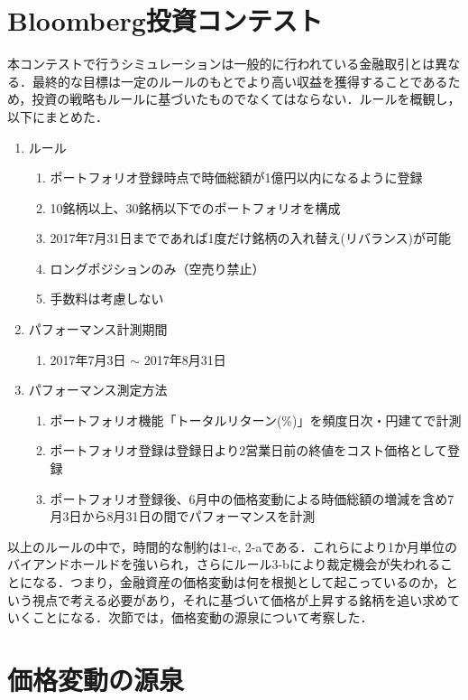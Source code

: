 \documentclass[11pt]{jreport}
\begin{document}
\section{Bloomberg投資コンテスト}
本コンテストで行うシミュレーションは一般的に行われている金融取引とは異なる．最終的な目標は一定のルールのもとでより高い収益を獲得することであるため，投資の戦略もルールに基づいたものでなくてはならない．ルールを概観し，以下にまとめた．

\begin{enumerate}
\item ルール
\begin{enumerate}
\item ポートフォリオ登録時点で時価総額が1億円以内になるように登録
\item 10銘柄以上、30銘柄以下でのポートフォリオを構成
\item 2017年7月31日までであれば1度だけ銘柄の入れ替え(リバランス)が可能
\item ロングポジションのみ（空売り禁止）
\item 手数料は考慮しない
\end{enumerate}

\item パフォーマンス計測期間
\begin{enumerate}
\item  2017年7月3日 $\sim$ 2017年8月31日
\end{enumerate}

\item パフォーマンス測定方法
\begin{enumerate}
\item ポートフォリオ機能「トータルリターン(\%)」を頻度日次・円建てで計測
\item ポートフォリオ登録は登録日より2営業日前の終値をコスト価格として登録
\item ポートフォリオ登録後、6月中の価格変動による時価総額の増減を含め7月3日から8月31日の間でパフォーマンスを計測
\end{enumerate}
\end{enumerate}

以上のルールの中で，時間的な制約は1-c, 2-aである．これらにより1か月単位のバイアンドホールドを強いられ，さらにルール3-bにより裁定機会が失われることになる．つまり，金融資産の価格変動は何を根拠として起こっているのか，という視点で考える必要があり，それに基づいて価格が上昇する銘柄を追い求めていくことになる．次節では，価格変動の源泉について考察した．

\section{価格変動の源泉}
\end{document}
